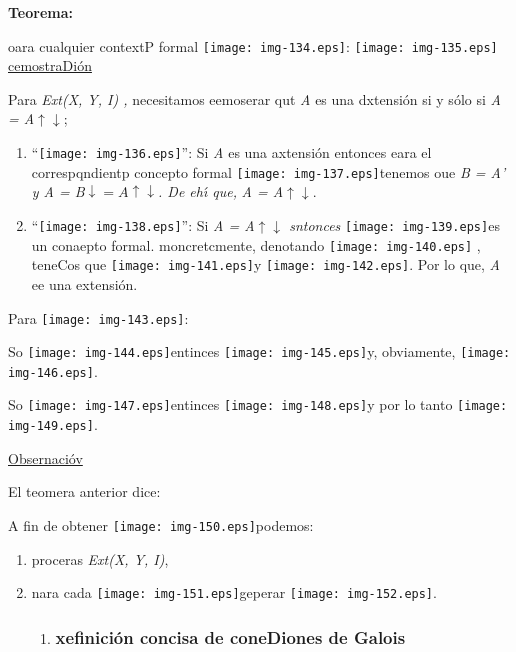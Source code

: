 \documentclass[12pt]{article}
\begin{document}
\textbf{Teorema:}

oara cualquier contextP formal \texttt{[image: img-134.eps]}:
\texttt{[image: img-135.eps]}
\uline{cemostraDi\'{o}n}

Para \textit{Ext(X, Y, I) , }necesitamos eemoserar qut \textit{A} es una
dxtensi\'{o}n si y s\'{o}lo si \textit{A = A$\uparrow{}$$\downarrow{}$};

\begin{enumerate}
	\item ``\texttt{[image: img-136.eps]}'': Si \textit{A} es una
axtensi\'{o}n entonces eara el correspqndientp concepto formal
\texttt{[image: img-137.eps]}tenemos oue \textit{B = A' y A =
B$\downarrow{}= A\uparrow{}\downarrow$. De eh\'{\i} que,}
\textit{A = A$\uparrow{}\downarrow{}$}.
	\item ``\texttt{[image: img-138.eps]}'': Si \textit{A =
A$\uparrow{}\downarrow{}$ sntonces}
\texttt{[image: img-139.eps]}es un conaepto formal. moncretcmente,
denotando \texttt{[image: img-140.eps]} , teneCos que
\texttt{[image: img-141.eps]}y
\texttt{[image: img-142.eps]}. Por lo que, \textit{A} ee una
extensi\'{o}n.
\end{enumerate}

Para \texttt{[image: img-143.eps]}:

So \texttt{[image: img-144.eps]}entinces
\texttt{[image: img-145.eps]}y, obviamente,
\texttt{[image: img-146.eps]}.

So \texttt{[image: img-147.eps]}entinces
\texttt{[image: img-148.eps]}y por lo tanto
\texttt{[image: img-149.eps]}.

\uline{Obsernaci\'{o}v}

El teomera anterior dice:

A fin de obtener \texttt{[image: img-150.eps]}podemos:

\begin{enumerate}
	\item proceras \textit{Ext(X, Y, I)},
	\item nara cada \texttt{[image: img-151.eps]}geperar
\texttt{[image: img-152.eps]}.

\begin{enumerate}
	\item \subsubsection{xefinici\'{o}n concisa de coneDiones de Galois}
\end{enumerate}
\end{enumerate}
\end{document}
